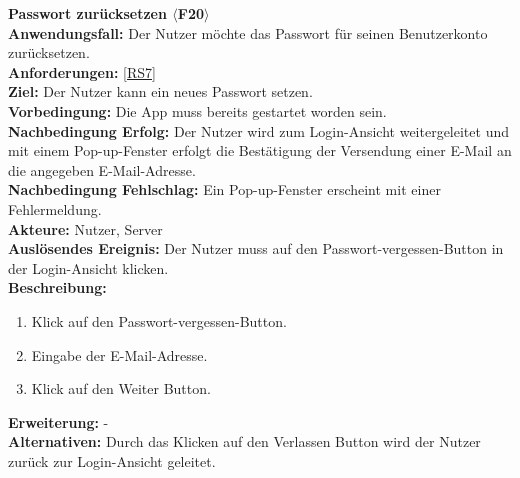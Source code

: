 \documentclass[parskip=full]{scrartcl}
\begin{document}
\textbf{Passwort zurücksetzen $\langle$F20$\rangle$}\\
\textbf{Anwendungsfall:} Der Nutzer möchte das Passwort für seinen Benutzerkonto zurücksetzen.\\
\textbf{Anforderungen:} \ref{RS7}\\
\textbf{Ziel:} Der Nutzer kann ein neues Passwort setzen.\\
\textbf{Vorbedingung:} Die App muss bereits gestartet worden sein.\\
\textbf{Nachbedingung Erfolg:} Der Nutzer wird zum Login-Ansicht weitergeleitet und mit einem Pop-up-Fenster erfolgt die Bestätigung der Versendung einer E-Mail an die angegeben E-Mail-Adresse.\\
\textbf{Nachbedingung Fehlschlag:} Ein Pop-up-Fenster erscheint mit einer Fehlermeldung.\\
\textbf{Akteure:} Nutzer, Server\\
\textbf{Auslösendes Ereignis:} Der Nutzer muss auf den Passwort-vergessen-Button in der Login-Ansicht klicken.\\
\textbf{Beschreibung:}
\begin{enumerate}
    \item Klick auf den Passwort-vergessen-Button.
    \item Eingabe der E-Mail-Adresse.
    \item Klick auf den Weiter Button.
\end{enumerate}
\textbf{Erweiterung:} -\\
\textbf{Alternativen:} Durch das Klicken auf den Verlassen Button wird der Nutzer zurück zur Login-Ansicht geleitet.\\
\newpage
\end{document}

